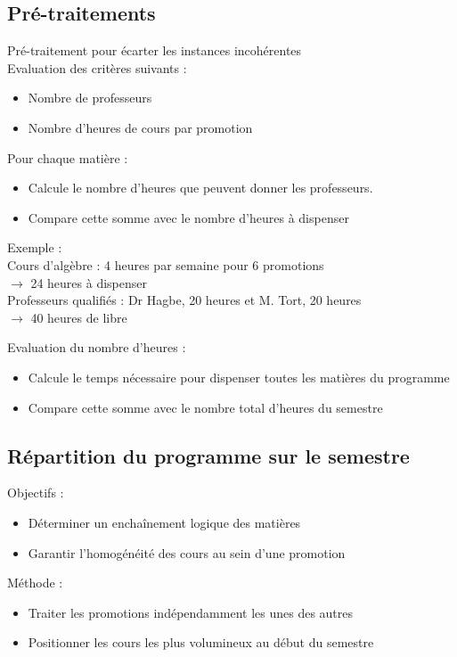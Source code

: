 \documentclass{beamer}
\begin{document}
\subsection{Pré-traitements}
\begin{frame}
Pré-traitement pour écarter les instances incohérentes\\
\vspace{\baselineskip}
Evaluation des critères suivants :
\begin {itemize}
\item Nombre de professeurs
\item Nombre d'heures de cours par promotion
\end{itemize}
\end{frame}

\begin{frame}
Pour chaque matière :
\begin{itemize}
\item Calcule le nombre d'heures que peuvent donner les professeurs.
\item Compare cette somme avec le nombre d'heures à dispenser
\end{itemize}
\vspace{\baselineskip}
Exemple :\\
Cours d'algèbre : 4 heures par semaine pour 6 promotions\\ 
$\rightarrow$ 24 heures à dispenser\\
Professeurs qualifiés : Dr Hagbe, 20 heures et M. Tort, 20 heures\\
$\rightarrow$ 40 heures de libre\\
\end{frame}

\begin{frame}
Evaluation du nombre d'heures :\\
\begin{itemize}
\item Calcule le temps nécessaire pour dispenser toutes les matières du programme
\item Compare cette somme avec le nombre total d'heures du semestre
\end{itemize}
\end{frame}


\subsection{Répartition du programme sur le semestre}
\begin{frame}
Objectifs :
\begin{itemize}
\item Déterminer un enchaînement logique des matières
\item Garantir l'homogénéité des cours au sein d'une promotion
\end{itemize}
\vspace{\baselineskip}
Méthode :
\begin{itemize}
\item Traiter les promotions indépendamment les unes des autres
\item Positionner les cours les plus volumineux au début du semestre
\end{itemize}
\end{frame}
\end{document}
